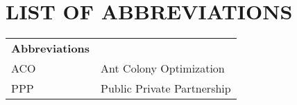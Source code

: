 \chapter{LIST OF ABBREVIATIONS}

\par\noindent
\vspace{2cm}
\begin{tabular}{@{}p{30mm}l@{}}
\textbf{Abbreviations}  & \\
ACO                     & Ant Colony Optimization\\
PPP                     & Public Private Partnership\\
\end{tabular}


